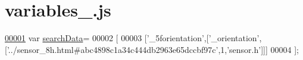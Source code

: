 \hypertarget{variables__0_8js_source}{}\section{variables\+\_.\+js}
\label{variables__0_8js_source}

\begin{DoxyCode}
\hypertarget{variables__0_8js_source.tex_l00001}{}\hyperlink{variables__0_8js_ad01a7523f103d6242ef9b0451861231e}{00001} var \hyperlink{variables__0_8js_ad01a7523f103d6242ef9b0451861231e}{searchData}=
00002 [
00003   [\textcolor{stringliteral}{'\_5forientation'},[\textcolor{stringliteral}{'\_orientation'},[\textcolor{stringliteral}{'../sensor\_8h.html#abc4898c1a34c444db2963e65dccbf97c'},1,\textcolor{stringliteral}{'sensor.h'}]]]
00004 ];
\end{DoxyCode}
